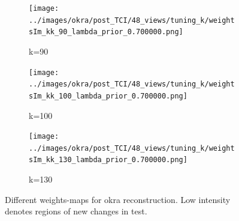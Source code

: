 \documentclass[journal]{IEEEtran}
\begin{document}
\begin{figure}[h]
\begin{subfigure}[b]{0.24\linewidth}
        \texttt{[image: ../images/okra/post\_TCI/48\_views/tuning\_k/weightsIm\_kk\_90\_lambda\_prior\_0.700000.png]}
        \caption{k=90}
     \end{subfigure}
   \begin{subfigure}[b]{0.24\linewidth}
        \texttt{[image: ../images/okra/post\_TCI/48\_views/tuning\_k/weightsIm\_kk\_100\_lambda\_prior\_0.700000.png]}
        \caption{k=100}
     \end{subfigure}
   \begin{subfigure}[b]{0.24\linewidth}
        \texttt{[image: ../images/okra/post\_TCI/48\_views/tuning\_k/weightsIm\_kk\_130\_lambda\_prior\_0.700000.png]}
        \caption{k=130}
     \end{subfigure}
    \caption{Different weights-maps for okra reconstruction. Low intensity denotes regions of new changes in test.}
\label{fig:few_view_okra_2D_weights}
\end{figure}
\end{document}
